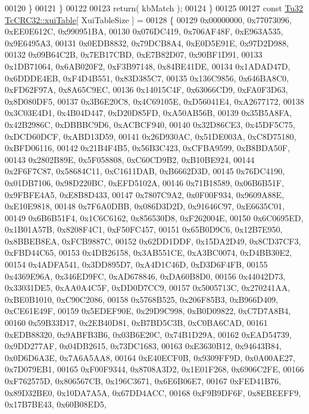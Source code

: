 \begin{DoxyCode}
00120       \}
00121    \}
00122 
00123    \textcolor{keywordflow}{return}( kbMatch );
00124 \}
00125 
00127 \textcolor{keyword}{const} \mbox{\hyperlink{namespace_g_n_common_a941b527ef318f318aed7903dc832b7e4}{Tu32}} \mbox{\hyperlink{class_g_n_common_1_1_n_data_authentication_1_1_tc_c_r_c32_a4aafd40037856d1bd4ea6f6ce0928836}{TcCRC32::xuiTable}}[ XuiTableSize ] =
00128 \{
00129    0x00000000, 0x77073096, 0xEE0E612C, 0x990951BA,
00130    0x076DC419, 0x706AF48F, 0xE963A535, 0x9E6495A3,
00131    0x0EDB8832, 0x79DCB8A4, 0xE0D5E91E, 0x97D2D988,
00132    0x09B64C2B, 0x7EB17CBD, 0xE7B82D07, 0x90BF1D91,
00133    0x1DB71064, 0x6AB020F2, 0xF3B97148, 0x84BE41DE,
00134    0x1ADAD47D, 0x6DDDE4EB, 0xF4D4B551, 0x83D385C7,
00135    0x136C9856, 0x646BA8C0, 0xFD62F97A, 0x8A65C9EC,
00136    0x14015C4F, 0x63066CD9, 0xFA0F3D63, 0x8D080DF5,
00137    0x3B6E20C8, 0x4C69105E, 0xD56041E4, 0xA2677172,
00138    0x3C03E4D1, 0x4B04D447, 0xD20D85FD, 0xA50AB56B,
00139    0x35B5A8FA, 0x42B2986C, 0xDBBBC9D6, 0xACBCF940,
00140    0x32D86CE3, 0x45DF5C75, 0xDCD60DCF, 0xABD13D59,
00141    0x26D930AC, 0x51DE003A, 0xC8D75180, 0xBFD06116,
00142    0x21B4F4B5, 0x56B3C423, 0xCFBA9599, 0xB8BDA50F,
00143    0x2802B89E, 0x5F058808, 0xC60CD9B2, 0xB10BE924,
00144    0x2F6F7C87, 0x58684C11, 0xC1611DAB, 0xB6662D3D,
00145    0x76DC4190, 0x01DB7106, 0x98D220BC, 0xEFD5102A,
00146    0x71B18589, 0x06B6B51F, 0x9FBFE4A5, 0xE8B8D433,
00147    0x7807C9A2, 0x0F00F934, 0x9609A88E, 0xE10E9818,
00148    0x7F6A0DBB, 0x086D3D2D, 0x91646C97, 0xE6635C01,
00149    0x6B6B51F4, 0x1C6C6162, 0x856530D8, 0xF262004E,
00150    0x6C0695ED, 0x1B01A57B, 0x8208F4C1, 0xF50FC457,
00151    0x65B0D9C6, 0x12B7E950, 0x8BBEB8EA, 0xFCB9887C,
00152    0x62DD1DDF, 0x15DA2D49, 0x8CD37CF3, 0xFBD44C65,
00153    0x4DB26158, 0x3AB551CE, 0xA3BC0074, 0xD4BB30E2,
00154    0x4ADFA541, 0x3DD895D7, 0xA4D1C46D, 0xD3D6F4FB,
00155    0x4369E96A, 0x346ED9FC, 0xAD678846, 0xDA60B8D0,
00156    0x44042D73, 0x33031DE5, 0xAA0A4C5F, 0xDD0D7CC9,
00157    0x5005713C, 0x270241AA, 0xBE0B1010, 0xC90C2086,
00158    0x5768B525, 0x206F85B3, 0xB966D409, 0xCE61E49F,
00159    0x5EDEF90E, 0x29D9C998, 0xB0D09822, 0xC7D7A8B4,
00160    0x59B33D17, 0x2EB40D81, 0xB7BD5C3B, 0xC0BA6CAD,
00161    0xEDB88320, 0x9ABFB3B6, 0x03B6E20C, 0x74B1D29A,
00162    0xEAD54739, 0x9DD277AF, 0x04DB2615, 0x73DC1683,
00163    0xE3630B12, 0x94643B84, 0x0D6D6A3E, 0x7A6A5AA8,
00164    0xE40ECF0B, 0x9309FF9D, 0x0A00AE27, 0x7D079EB1,
00165    0xF00F9344, 0x8708A3D2, 0x1E01F268, 0x6906C2FE,
00166    0xF762575D, 0x806567CB, 0x196C3671, 0x6E6B06E7,
00167    0xFED41B76, 0x89D32BE0, 0x10DA7A5A, 0x67DD4ACC,
00168    0xF9B9DF6F, 0x8EBEEFF9, 0x17B7BE43, 0x60B08ED5,

\end{DoxyCode}
